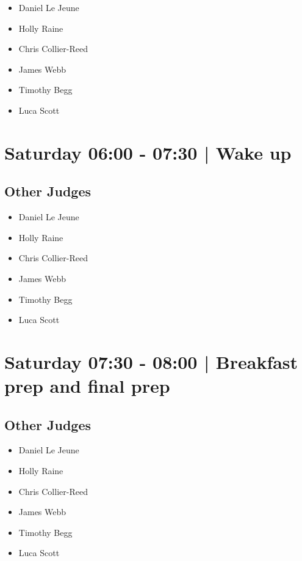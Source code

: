 \documentclass[10pt]{article}
\begin{document}
            \begin{itemize}
                            \item Daniel Le Jeune
                            \item Holly Raine
                            \item Chris Collier-Reed
                            \item James Webb
                            \item Timothy Begg
                            \item Luca Scott
                        \end{itemize}
        

            \section*{Saturday 06:00
        -
        07:30
        |
         Wake up}
        
                
        \subsection*{Other Judges}
        
            \begin{itemize}
                            \item Daniel Le Jeune
                            \item Holly Raine
                            \item Chris Collier-Reed
                            \item James Webb
                            \item Timothy Begg
                            \item Luca Scott
                        \end{itemize}
        

            \section*{Saturday 07:30
        -
        08:00
        |
         Breakfast prep and final prep}
        
                
        \subsection*{Other Judges}
        
            \begin{itemize}
                            \item Daniel Le Jeune
                            \item Holly Raine
                            \item Chris Collier-Reed
                            \item James Webb
                            \item Timothy Begg
                            \item Luca Scott
                        \end{itemize}
        
\end{document}
